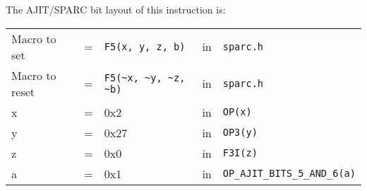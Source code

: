 \begin{enumerate}
\begin{enumerate}
    The AJIT/SPARC bit layout of this instruction is:

    \begin{tabular}[h]{lclcl}
      Macro to set   &=&  \verb|F5(x, y, z, b)|     &in& \verb|sparc.h|     \\
      Macro to reset &=&  \verb|F5(~x, ~y, ~z, ~b)| &in& \verb|sparc.h|     \\
      x &=& 0x2      &in& \verb|OP(x)| \\
      y &=& 0x27     &in& \verb|OP3(y)| \\
      z &=& 0x0      &in& \verb|F3I(z)| \\
      a &=& 0x1      &in& \verb|OP_AJIT_BITS_5_AND_6(a)|
    \end{tabular}
  \end{enumerate}
\end{enumerate}
